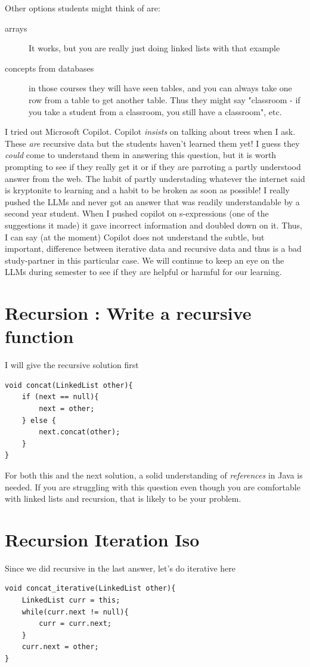 \documentclass[twoside=false,DIV=14]{scrartcl}
\begin{document}
    Other options students might think of are:
    \begin{description}
    \item[arrays] It works, but you are really just doing linked lists with that example
    \item[concepts from databases] in those courses they will have seen tables, and you can always take one row from a table to get another table.  Thus they might say "classroom - if you take a student from a classroom, you still have a classroom", etc.
    \end{description}
    I tried out Microsoft Copilot.  Copilot \emph{insists} on talking about trees when I ask.  These \emph{are} recursive data but the students haven't learned them yet!  I guess they \emph{could} come to understand them in answering this question, but it is worth prompting to see if they really get it or if they are parroting a partly understood answer from the web.  The habit of partly understading whatever the internet said is kryptonite to learning and a habit to be broken as soon as possible!  I really pushed the LLMs and never got an answer that was readily understandable by a second year student.  When I pushed copilot on s-expressions (one of the suggestions it made) it gave incorrect information and doubled down on it.   Thus, I can say (at the moment) Copilot does not understand the subtle, but important, difference between iterative data and recursive data and thus is a bad study-partner in this particular case. We will continue to keep an eye on the LLMs during semester to see if they are helpful or harmful for our learning.

\section{Recursion : Write a recursive function}
I will give the recursive solution first 
\begin{lstlisting}
void concat(LinkedList other){
    if (next == null){
        next = other;
    } else {
        next.concat(other);
    }
}
\end{lstlisting}
For both this and the next solution, a solid understanding of \emph{references} in Java is needed.  If you are struggling with this question even though you are comfortable with linked lists and recursion, that is likely to be your problem.

\section{Recursion Iteration Iso}
Since we did recursive in the last answer, let's do iterative here
\begin{lstlisting}
void concat_iterative(LinkedList other){
    LinkedList curr = this;
    while(curr.next != null){
        curr = curr.next;
    }
    curr.next = other;
}
\end{lstlisting}
  
\end{document}
